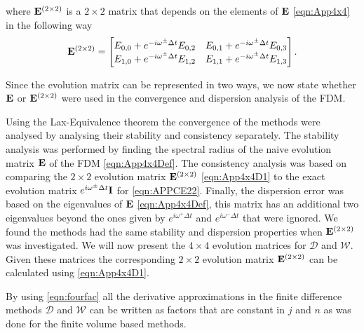 where $\mathbf{E}^{\left(2 \times 2\right)}$ is a $2 \times 2$ matrix that depends on the elements of $\mathbf{E}$ \eqref{eqn:App4x4} in the following way
\begin{equation}
\label{eqn:App4x4D1}
\mathbf{E}^{\left(2 \times 2\right)} = \begin{bmatrix}E_{0,0} + e^{-i \omega^{\pm }\Delta t} E_{0,2} & E_{0,1} + e^{-i \omega^{\pm }\Delta t} E_{0,3} \\
E_{1,0} + e^{-i \omega^{\pm }\Delta t} E_{1,2} & E_{1,1} + e^{-i \omega^{\pm }\Delta t} E_{1,3} \\
\end{bmatrix}.
\end{equation}

Since the evolution matrix can be represented in two ways, we now state whether $\mathbf{E}$ or $\mathbf{E}^{\left(2 \times 2\right)}$ were used in the convergence and dispersion analysis of the FDM. 

Using the Lax-Equivalence theorem the convergence of the methods were analysed by analysing their stability and consistency separately. The stability analysis was performed by finding the spectral radius of the naive evolution matrix $\mathbf{E}$ of the FDM \eqref{eqn:App4x4Def}. The consistency analysis was based on comparing the $2\times2$ evolution matrix $\mathbf{E}^{\left(2 \times 2\right)}$ \eqref{eqn:App4x4D1} to the exact evolution matrix $e^{i \omega^\pm \Delta t}\mathbf{I} $ for \eqref{eqn:APPCE22}. Finally, the dispersion error was based on the eigenvalues of $\mathbf{E}$ \eqref{eqn:App4x4Def}, this matrix has an additional two eigenvalues beyond the ones given by $e^{i \omega^+ \Delta t}$ and $e^{i \omega^- \Delta t}$ that were ignored. We found the methods had the same stability and dispersion properties when $\mathbf{E}^{\left(2 \times 2\right)}$ was investigated. We will now present the $4\times4$ evolution matrices for $\mathcal{D}$ and $\mathcal{W}$. Given these matrices the corresponding $2\times 2$ evolution matrix $\mathbf{E}^{\left(2 \times 2\right)}$ can be calculated using \eqref{eqn:App4x4D1}.



By using \eqref{eqn:fourfac} all the derivative approximations in the finite difference methods $\mathcal{D}$ and $\mathcal{W}$ can be written as factors that are constant in $j$ and $n$ as was done for the finite volume based methods.

